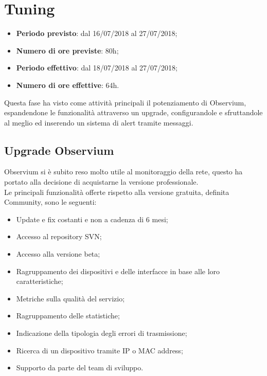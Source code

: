 \documentclass[Realizzazione.tex]{subfiles}
\begin{document}
\section{Tuning}
\begin{itemize}
	\item \textbf{Periodo previsto}: dal 16/07/2018 al 27/07/2018;
	\item \textbf{Numero di ore previste}: 80h;
	\item \textbf{Periodo effettivo}: dal 18/07/2018 al 27/07/2018;
	\item \textbf{Numero di ore effettive}: 64h.
\end{itemize}
Questa fase ha visto come attività principali il potenziamento di Observium, espandendone le funzionalità attraverso un upgrade, configurandole e sfruttandole al meglio ed inserendo un sistema di alert tramite messaggi.

\subsection{Upgrade Observium}
Observium si è subito reso molto utile al monitoraggio della rete, questo ha portato alla decisione di acquistarne la versione professionale. \\
Le principali funzionalità offerte rispetto alla versione gratuita, definita Community, sono le seguenti:
\begin{itemize}
	\item Update e fix costanti e non a cadenza di 6 mesi;
	\item Accesso al repository SVN;
	\item Accesso alla versione beta;
	\item Ragruppamento dei dispositivi e delle interfacce in base alle loro caratteristiche;
	\item Metriche sulla qualità del servizio;
	\item Ragruppamento delle statistiche;
	\item Indicazione della tipologia degli errori di trasmissione;
	\item Ricerca di un dispositivo tramite IP o MAC address;
	\item Supporto da parte del team di sviluppo.
\end{itemize}
\end{document}
